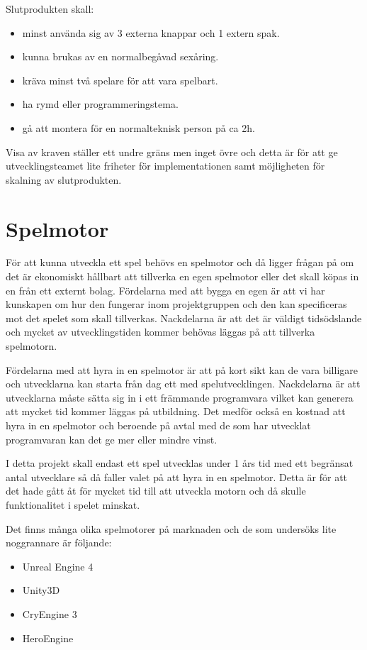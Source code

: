 \documentclass[a4paper,12pt,oneside,final]{extbook}
\begin{document}
Slutprodukten skall:
\begin{itemize}
	\item minst använda sig av 3 externa knappar och 1 extern spak.
	\item kunna brukas av en normalbegåvad sexåring.
	\item kräva minst två spelare för att vara spelbart.
	\item ha rymd eller programmeringstema.
	\item gå att montera för en normalteknisk person på ca 2h.
\end{itemize}

Visa av kraven ställer ett undre gräns men inget övre och detta är för att ge utvecklingsteamet lite friheter för implementationen samt möjligheten för skalning av slutprodukten.


\section{Spelmotor}
För att kunna utveckla ett spel behövs en spelmotor och då ligger frågan på om det är ekonomiskt hållbart att tillverka en egen spelmotor eller det skall köpas in en från ett externt bolag. Fördelarna med att bygga en egen är att vi har kunskapen om hur den fungerar inom projektgruppen och den kan specificeras mot det spelet som skall tillverkas. Nackdelarna är att det är väldigt tidsödslande och mycket av utvecklingstiden kommer behövas läggas på att tillverka spelmotorn. 

Fördelarna med att hyra in en spelmotor är att på kort sikt kan de vara billigare och utvecklarna kan starta från dag ett med spelutvecklingen. Nackdelarna är att utvecklarna måste sätta sig in i ett främmande programvara vilket kan generera att mycket tid kommer läggas på utbildning. Det medför också en kostnad att hyra in en spelmotor och beroende på avtal med de som har utvecklat programvaran kan det ge mer eller mindre vinst.

I detta projekt skall endast ett spel utvecklas under 1 års tid med ett begränsat antal utvecklare så då faller valet på att hyra in en spelmotor. Detta är för att det hade gått åt för mycket tid till att utveckla motorn och då skulle funktionalitet i spelet minskat.

Det finns många olika spelmotorer på marknaden och de som undersöks lite noggrannare är följande:

\begin{itemize}
	\item Unreal Engine 4
	\item Unity3D
	\item CryEngine 3
	\item HeroEngine
	
\end{itemize}
\end{document}
